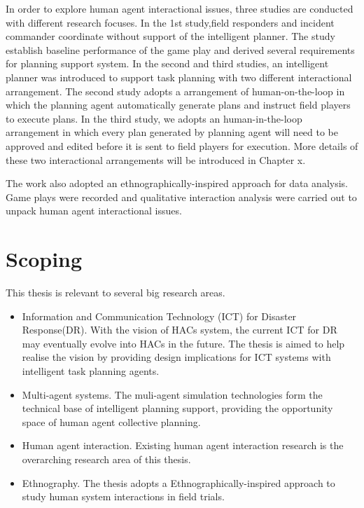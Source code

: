 In order to explore human agent interactional issues, three studies are conducted with different research focuses. In the 1st study,field responders and incident commander coordinate without support of the intelligent planner. The study establish baseline performance of the game play and derived several requirements for planning support system. In the second and third studies, an intelligent planner was introduced to support task planning with two different interactional arrangement. The second study adopts a arrangement of human-on-the-loop in which the planning agent automatically generate plans and instruct field players to execute plans. In the third study, we adopts an human-in-the-loop arrangement in which every plan generated by planning agent will need to be approved and edited before it is sent to field players for execution. More details of these two interactional arrangements will be introduced in Chapter x.

The work also adopted an ethnographically-inspired approach for data analysis. Game plays were recorded and qualitative interaction analysis were carried out to unpack human agent interactional issues.\\


\section{Scoping}\label{sec:custom}

This thesis is relevant to several big research areas. \\

\begin{itemize}
  \item Information and Communication Technology (ICT) for Disaster Response(DR). With the vision of HACs system, the current ICT for DR may eventually evolve into HACs in the future. The thesis is aimed to help realise the vision by providing design implications for ICT systems with intelligent task planning agents. 
  \item Multi-agent systems. The muli-agent simulation technologies form the technical base of intelligent planning support, providing the opportunity space of human agent collective planning. 
  \item Human agent interaction. Existing human agent interaction research is the overarching research area of this thesis. 
  \item Ethnography. The thesis adopts a Ethnographically-inspired approach to study human system interactions in field trials.
\end{itemize}

